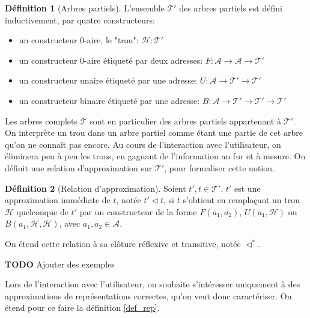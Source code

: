 \documentclass[11pt,a4paper]{article}
\theoremstyle{plain}
\theoremstyle{definition}
\newtheorem{definition}{Définition}
\theoremstyle{remark}
\newcommand*{\addresses}{\ensuremath{\mathcal{A}}}
\newcommand*{\trees}{\ensuremath{\mathcal{T}}}
\newcommand*{\treespartial}{\ensuremath{\mathcal{T'}}}
\newcommand*{\relapprox}{\ensuremath{\triangleleft}}
\newcommand*{\relapproxlarge}{\ensuremath{\relapprox^*}}
\newcommand*{\unknown}{\mathcal{H}}
\newcommand*{\todo}{{\normalfont \textbf{TODO}} }
\begin{document}
\begin{definition}[Arbres partiels]
    L'ensemble \treespartial{} des arbres partiels est défini inductivement, par quatre constructeurs:
    \begin{itemize}
      \item un constructeur $0$-aire, le "trou": $\unknown: \treespartial$
      \item un constructeur $0$-aire étiqueté par deux adresses: $F: \mathcal{A} \rightarrow \mathcal{A} \rightarrow \treespartial$
      \item un constructeur unaire étiqueté par une adresse: $U: \mathcal{A} \rightarrow \treespartial \rightarrow \treespartial$
      \item un constructeur binaire étiqueté par une adresse: $B: \mathcal{A} \rightarrow \treespartial \rightarrow \treespartial \rightarrow \treespartial$
    \end{itemize}
\end{definition}

Les arbres complets \trees{} sont en particulier des arbres partiels appartenant à \treespartial{}. On interprète un trou dans un arbre partiel comme étant une partie de cet arbre qu'on ne connaît pas encore. Au cours de l'interaction avec l'utilisateur, on éliminera peu à peu les trous, en gagnant de l'information au fur et à mesure. On définit une relation d'approximation sur \treespartial{}, pour formaliser cette notion.

\begin{definition}[Relation d'approximation]
    Soient $t', t \in \treespartial$. $t'$ est une approximation immédiate de $t$, notée $t' \relapprox t$, si $t$ s'obtient en remplaçant un trou $\unknown$ quelconque de $t'$ par un constructeur de la forme $F(a_1, a_2)$, $U(a_1, \unknown)$ ou $B(a_1, \unknown, \unknown)$, avec $a_1, a_2 \in \addresses$.

    On étend cette relation à sa clôture réflexive et transitive, notée $\relapproxlarge$.
\end{definition}
\todo{Ajouter des exemples}

Lors de l'interaction avec l'utilisateur, on souhaite s'intéresser uniquement à des approximations de représentations correctes, qu'on veut donc caractériser. On étend pour ce faire la définition \ref{def_rep}.
\end{document}
